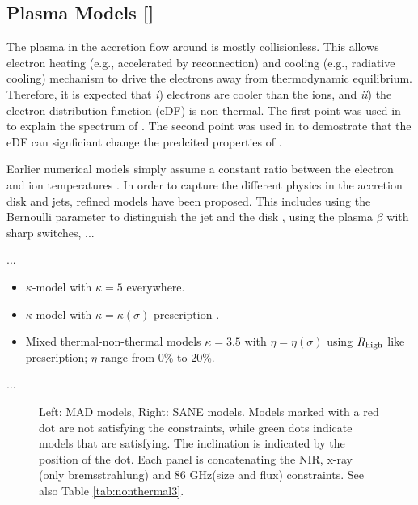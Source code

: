 \documentclass[twocolumn,tighten,dvipsnames,linenumbers]{aastex63}
\begin{document}
\subsection{Plasma Models
  []}
\label{sec:eDF}

The plasma in the accretion flow around \sgra is mostly collisionless.
This allows electron heating (e.g., accelerated by reconnection) and
cooling (e.g., radiative cooling) mechanism to drive the electrons
away from thermodynamic equilibrium.
Therefore, it is expected that \emph{i}) electrons are cooler than the
ions, and \emph{ii}) the electron distribution function (eDF) is
non-thermal.
The first point was used in \citet{1998ApJ...492..554N} to explain the
spectrum of \sgra.
The second point was used in \citep{2000ApJ...541..234O} to demostrate
that the eDF can signficiant change the predcited properties of \sgra.

Earlier numerical models simply assume a constant ratio between the
electron and ion temperatures \citep{...}.
In order to capture the different physics in the accretion disk and
jets, refined models have been proposed.
This includes using the Bernoulli parameter to distinguish the jet and
the disk \citep{2014A&A...570A...7M}, using the plasma $\beta$
\citep{2015ApJ...799....1C, 2015ApJ...812..103C} with sharp switches, ...

...

\begin{itemize}
\item $\kappa$-model with $\kappa = 5$ everywhere.
\item $\kappa$-model with $\kappa = \kappa(\sigma)$ prescription
  \citep{2016ApJ...826...77B}.
\item Mixed thermal-non-thermal models $\kappa = 3.5$ with $\eta =
  \eta(\sigma)$ using ${R_\mathrm{high}}$ like prescription; $\eta$ range from 0\%
  to 20\%.
\end{itemize}

...

\begin{figure}
  \caption{Left: MAD models, Right: SANE models.  Models marked with a red dot are not satisfying the constraints, while green dots indicate models that are satisfying.  The inclination is indicated by the position of the dot. Each panel is concatenating  the NIR, x-ray (only bremsstrahlung) and 86 GHz(size and flux) constraints. See also Table \ref{tab:nonthermal3}. }
  \label{fig:nonthermal3}
\end{figure}
\end{document}

